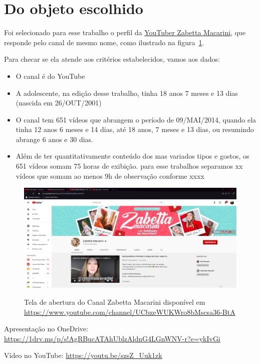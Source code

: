 \section{Do objeto escolhido}

Foi selecionado para esse trabalho o perfil da \href{https://www.youtube.com/channel/UCbxeWUKWro8bMscsa36-BtA}{YouTuber Zabetta Macarini}, que responde pelo canal  de mesmo nome, como ilustrado na figura~\ref{fig:canal-zabetta-macarini}.

Para checar se ela atende aos critérios estabelecidos, vamos aos dados:
\begin{itemize}
    \item O canal é do YouTube
    \item A adolescente, na edição desse trabalho, tinha 18 anos 7 meses e 13 dias (nascida em 26/OUT/2001)
    \item O canal tem 651 vídeos que abrangem o período de 09/MAI/2014, quando ela tinha 12 anos 6 meses e 14 dias, até 18 anos, 7 meses e 13 dias, ou resumindo abrange 6 anos e 30 dias.
    \item Além de ter quantitativamente conteúdo dos mas variados tipos e gostos, os 651 vídeos somam 75 horas de exibição. para esse trabalhos separamos xx vídeos que somam ao menos 9h de observação conforme xxxx
\end{itemize}


\begin{figure}[h!]
    \centering
    \href{https://www.youtube.com/channel/UCbxeWUKWro8bMscsa36-BtA}{
        \includegraphics[width=0.999\linewidth]{fig/Canal-Zabetta-Macarini}
    }
    \caption{Tela de abertura do Canal Zabetta Macarini disponível em \url{https://www.youtube.com/channel/UCbxeWUKWro8bMscsa36-BtA}}
    \label{fig:canal-zabetta-macarini}
\end{figure}




Apresentação no OneDrive: \url{https://1drv.ms/p/s!AgRBucATAhUblzAldnG4LGnWNV-r?e=ykIvGi} \\
\begin{center}
    \href{https://1drv.ms/p/s!AgRBucATAhUblzAldnG4LGnWNV-r?e=ykIvGi}{
    }
\end{center}


Vídeo no YouTube: \url{https://youtu.be/szsZ_Uuk1zk} \\
\begin{center}
    \href{https://youtu.be/szsZ_Uuk1zk}{
    }
\end{center}
